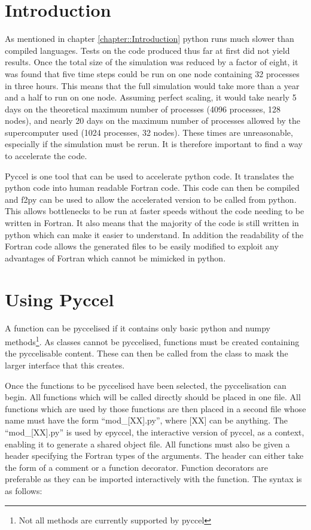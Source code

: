 
\section{Introduction}

As mentioned in chapter \ref{chapter::Introduction} python runs much slower than compiled languages. Tests on the code produced thus far at first did not yield results. Once the total size of the simulation was reduced by a factor of eight, it was found that five time steps could be run on one node containing 32 processes in three hours. This means that the full simulation would take more than a year and a half to run on one node. Assuming perfect scaling, it would take nearly 5 days on the theoretical maximum number of processes (4096 processes, 128 nodes), and nearly 20 days on the maximum number of processes allowed by the supercomputer used (1024 processes, 32 nodes). These times are unreasonable, especially if the simulation must be rerun. It is therefore important to find a way to accelerate the code.

Pyccel \cite{Pyccel} is one tool that can be used to accelerate python code. It translates the python code into human readable Fortran code. This code can then be compiled and f2py can be used to allow the accelerated version to be called from python. This allows bottlenecks to be run at faster speeds without the code needing to be written in Fortran. It also means that the majority of the code is still written in python which can make it easier to understand. In addition the readability of the Fortran code allows the generated files to be easily modified to exploit any advantages of Fortran which cannot be mimicked in python.

\section{Using Pyccel}

A function can be pyccelised if it contains only basic python and numpy methods\footnote{Not all methods are currently supported by pyccel}. As classes cannot be pyccelised, functions must be created containing the pyccelisable content. These can then be called from the class to mask the larger interface that this creates.

Once the functions to be pyccelised have been selected, the pyccelisation can begin. All functions which will be called directly should be placed in one file. All functions which are used by those functions are then placed in a second file whose name must have the form ``mod\_[XX].py'', where [XX] can be anything. The ``mod\_[XX].py'' is used by epyccel, the interactive version of pyccel, as a context, enabling it to generate a shared object file. All functions must also be given a header specifying the Fortran types of the arguments. The header can either take the form of a comment or a function decorator. Function decorators are preferable as they can be imported interactively with the function. The syntax is as follows:

